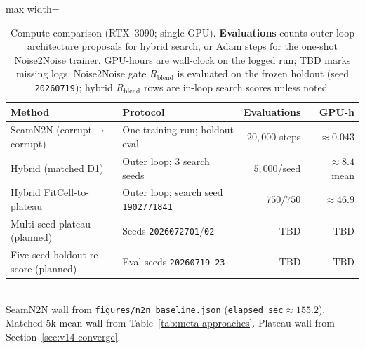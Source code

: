\begin{table}[t]
  \centering
  \caption{Compute comparison (RTX~3090; single GPU).
    \textbf{Evaluations} counts outer-loop architecture proposals for hybrid search, or Adam steps for the one-shot Noise2Noise trainer.
    GPU-hours are wall-clock on the logged run; TBD marks missing logs.
    Noise2Noise gate $R_{\mathrm{blend}}$ is evaluated on the frozen holdout (seed \texttt{20260719}); hybrid $R_{\mathrm{blend}}$ rows are in-loop search scores unless noted.}
  \label{tab:compute-n2n-hybrid}
  \setlength{\tabcolsep}{3pt}
  \footnotesize
  \begin{adjustbox}{max width=\columnwidth}
  \begin{tabular}{@{}lp{}rr@{}}
    \toprule
    Method & Protocol & Evaluations & GPU-h \\
    \midrule
    SeamN2N (corrupt$\to$corrupt) & One training run; holdout eval & $20{,}000$ steps & ${\approx}0.043$ \\
    Hybrid (matched D1) & Outer loop; 3 search seeds & $5{,}000$/seed & ${\approx}8.4$ mean \\
    Hybrid FitCell-to-plateau & Outer loop; search seed \texttt{1902771841} & $750/750$ & ${\approx}46.9$ \\
    Multi-seed plateau (planned) & Seeds \texttt{2026072701}/\texttt{02} & TBD & TBD \\
    Five-seed holdout re-score (planned) & Eval seeds \texttt{20260719}--\texttt{23} & TBD & TBD \\
    \bottomrule
  \end{tabular}
  \end{adjustbox}\\[0.35em]
  {\footnotesize SeamN2N wall from \texttt{figures/n2n\_baseline.json} (\texttt{elapsed\_sec}${\approx}155.2$).
  Matched-$5$k mean wall from Table~\ref{tab:meta-approaches}.
  Plateau wall from Section~\ref{sec:v14-converge}.}
\end{table}
